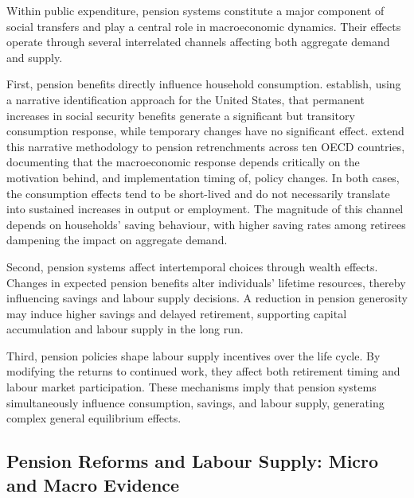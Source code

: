 \documentclass[11pt,english,a4paper, twoside, authoryear]{article}
\begin{document}
Within public expenditure, pension systems constitute a major component of social transfers and play a central role in macroeconomic dynamics. Their effects operate through several interrelated channels affecting both aggregate demand and supply.

First, pension benefits directly influence household consumption. \citet{RomerRomer2016} establish, using a narrative identification approach for the United States, that permanent increases in social security benefits generate a significant but transitory consumption response, while temporary changes have no significant effect. \citet{BiZubairy2023} extend this narrative methodology to pension retrenchments across ten OECD countries, documenting that the macroeconomic response depends critically on the motivation behind, and implementation timing of, policy changes. In both cases, the consumption effects tend to be short-lived and do not necessarily translate into sustained increases in output or employment. The magnitude of this channel depends on households' saving behaviour, with higher saving rates among retirees dampening the impact on aggregate demand.

Second, pension systems affect intertemporal choices through wealth effects. Changes in expected pension benefits alter individuals' lifetime resources, thereby influencing savings and labour supply decisions. A reduction in pension generosity may induce higher savings and delayed retirement, supporting capital accumulation and labour supply in the long run.

Third, pension policies shape labour supply incentives over the life cycle. By modifying the returns to continued work, they affect both retirement timing and labour market participation. These mechanisms imply that pension systems simultaneously influence consumption, savings, and labour supply, generating complex general equilibrium effects.

\subsection{Pension Reforms and Labour Supply: Micro and Macro Evidence}
\end{document}
